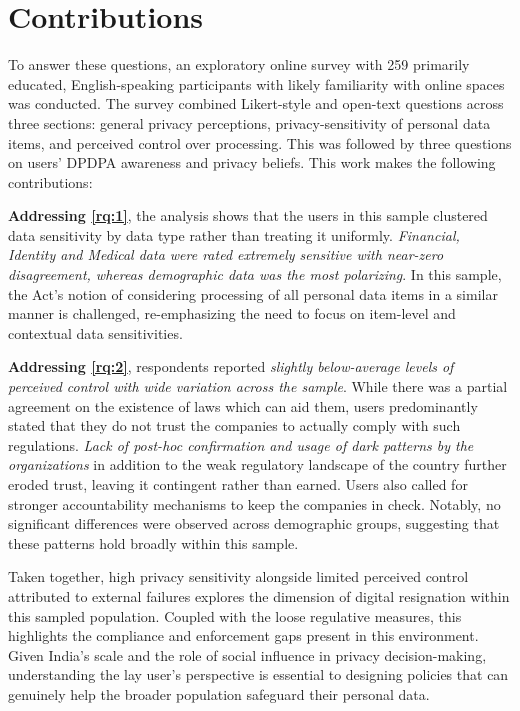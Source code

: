 \section{Contributions}

To answer these questions, an exploratory online survey with 259 primarily educated, English-speaking participants with likely familiarity with online spaces was conducted. The survey combined Likert-style and open-text questions across three sections: general privacy perceptions, privacy-sensitivity of personal data items, and perceived control over processing. This was followed by three questions on users' DPDPA awareness and privacy beliefs. This work makes the following contributions:

\textbf{Addressing \ref{rq:1}}, the analysis shows that the users in this sample clustered data sensitivity by data type rather than treating it uniformly. \textit{Financial, Identity and Medical data were rated extremely sensitive with near-zero disagreement, whereas demographic data was the most polarizing}. In this sample, the Act's notion of considering processing of all personal data items in a similar manner is challenged, re-emphasizing the need to focus on item-level and contextual data sensitivities. 

\textbf{Addressing \ref{rq:2}}, respondents reported \textit{slightly below-average levels of perceived control with wide variation across the sample}. While there was a partial agreement on the existence of laws which can aid them, users predominantly stated that they do not trust the companies to actually comply with such regulations. \textit{Lack of post-hoc confirmation and usage of dark patterns by the organizations} in addition to the weak regulatory landscape of the country further eroded trust, leaving it contingent rather than earned. Users also called for stronger accountability mechanisms to keep the companies in check. Notably, no significant differences were observed across demographic groups, suggesting that these patterns hold broadly within this sample. 

Taken together, high privacy sensitivity alongside limited perceived control attributed to external failures explores the dimension of digital resignation within this sampled population. Coupled with the loose regulative measures, this highlights the compliance and enforcement gaps present in this environment. Given India's scale and the role of social influence in privacy decision-making, understanding the lay user's perspective is essential to designing policies that can genuinely help the broader population safeguard their personal data. 

